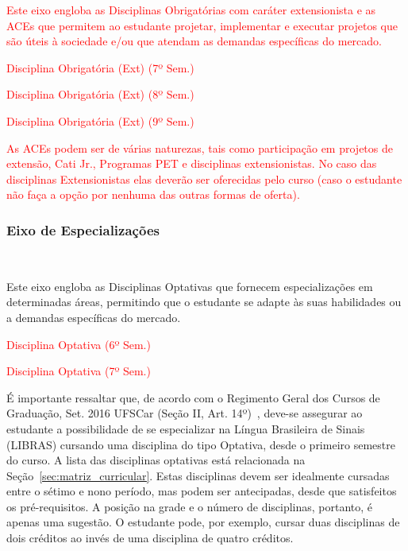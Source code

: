 \textcolor{red}{Este eixo engloba as Disciplinas Obrigatórias com caráter extensionista e as ACEs que permitem ao estudante projetar, implementar e executar projetos que são úteis à sociedade e/ou que atendam as demandas específicas do mercado.}

\textcolor{red}{\begin{compenum}
    \item Disciplina Obrigatória (Ext) (7º Sem.)
    \item Disciplina Obrigatória (Ext) (8º Sem.)
    \item Disciplina Obrigatória (Ext) (9º Sem.)
\end{compenum}}

\textcolor{red}{As ACEs podem ser de várias naturezas, tais como participação em projetos de extensão, Cati Jr., Programas PET e disciplinas extensionistas. No caso das disciplinas Extensionistas elas deverão ser oferecidas pelo curso (caso o estudante não faça a opção por nenhuma das outras formas de oferta).}

\subsubsection{Eixo de Especializações }~\label{sec:E9}

Este eixo engloba as Disciplinas Optativas que fornecem especializações em determinadas áreas, permitindo que o estudante se adapte às suas habilidades ou a demandas específicas do mercado.

\textcolor{red}{\begin{compenum}
    \item Disciplina Optativa (6º Sem.)
    \item Disciplina Optativa (7º Sem.)
\end{compenum}}

É importante ressaltar que, de acordo com o Regimento Geral dos Cursos de Graduação, Set. 2016 UFSCar (Seção II, Art. 14º)~\cite{RGCG}, deve-se assegurar ao estudante a possibilidade de se especializar na Língua Brasileira de Sinais (LIBRAS) cursando uma disciplina do tipo Optativa, desde o primeiro semestre do curso. A lista das disciplinas optativas está relacionada na Seção~\ref{sec:matriz_curricular}. Estas disciplinas devem ser idealmente cursadas entre o sétimo e nono período, mas podem ser antecipadas, desde que satisfeitos os pré-requisitos. A posição na grade e o número de disciplinas, portanto, é apenas uma sugestão. O estudante pode, por exemplo, cursar duas disciplinas de dois créditos ao invés de uma disciplina de quatro créditos.%


